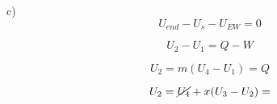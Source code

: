 c)
\begin{equation}
U_{end} - U_{s} - U_{EW} = 0
\end{equation}

\[
U_2 - U_1 = Q - W
\]

\[
U_2 = m(U_4 - U_1) = Q
\]

\[
U_2 = \cancel{U_4} + x(U_3 - U_2) =
\]